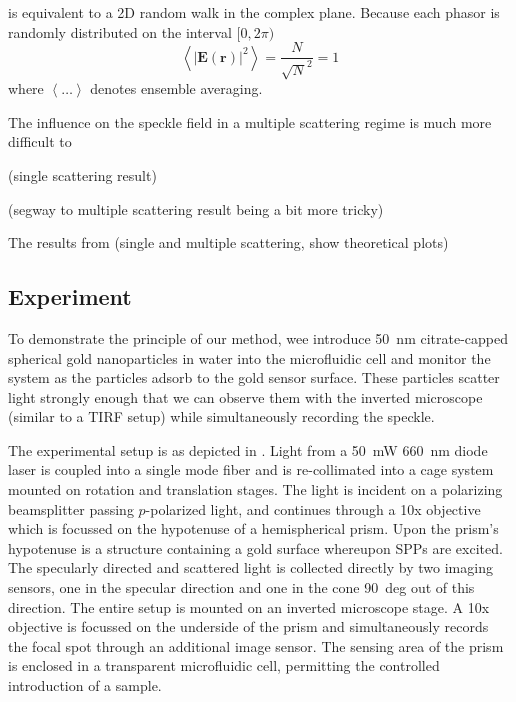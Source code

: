  is equivalent to a 2D random walk in the
complex plane.  Because each phasor is randomly distributed on the interval
$[0,2\pi)$
\begin{equation}
\left<|\mathbf{E}(\mathbf{r})|^2\right> = \frac{N}{\sqrt{N}^2} = 1
\end{equation}
where $\left<\dots\right>$ denotes ensemble averaging.  

The influence on the speckle field in a multiple scattering regime is much
more difficult to 

(single scattering result)

(segway to multiple scattering result being a bit more tricky)


The results from (single and multiple scattering, show theoretical plots)



\subsection{Experiment}
To demonstrate the principle of our method, wee introduce
\SI{50}{\nano\meter} citrate-capped spherical gold nanoparticles in water
into the microfluidic cell and monitor the system as the particles adsorb
to the gold sensor surface.  These particles scatter light strongly enough
that we can observe them with the inverted microscope (similar to a TIRF
setup) while simultaneously recording the speckle. 

The experimental setup is as depicted in .  Light from
a \SI{50}{\milli\watt} \SI{660}{\nano\meter} diode laser is coupled into a
single mode fiber and is re-collimated into a cage system mounted on
rotation and translation stages.  The light is incident on a polarizing
beamsplitter passing $p$-polarized light, and continues through a 10x
objective which is focussed on the hypotenuse of a hemispherical prism.
Upon the prism's hypotenuse is a structure containing a gold surface
whereupon SPPs are excited.  The specularly directed and scattered light is
collected directly by two imaging sensors, one in the specular direction
and one in the cone \SI{90}{deg} out of this direction.  The entire setup
is mounted on an inverted microscope stage.  A 10x objective is focussed on
the underside of the prism and simultaneously records the focal spot
through an additional image sensor.  The sensing area of the prism is
enclosed in a transparent microfluidic cell, permitting the controlled
introduction of a sample.

